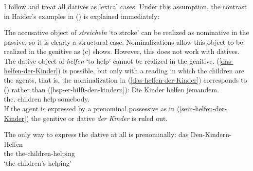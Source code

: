 I follow \citet{Haider86} and treat all datives as lexical cases. Under this assumption, the
contrast in Haider's examples \citeyearpar[]{Haider86} in () is explained immediately:
\eal
{}

\label{das-helfen-der-Kinder}
\label{sein-helfen-der-Kinder}
\zl
The accusative object of \emph{streicheln} `to stroke' can be realized as nominative in the passive,
so it is clearly a structural case. Nominalizations allow this object to be realized in the genitive
as (c) shows. However, this does not work with datives. The dative object of \emph{helfen}
`to help' cannot be realized in the genitive. (\ref{das-helfen-der-Kinder}) is possible, but only
with a reading in which the children are the agents, that is, the nominalization in
(\ref{das-helfen-der-Kinder}) corresponds to () rather than (\ref{bsp-er-hilft-den-kindern}):
\ea
\gll Die Kinder helfen jemandem.\\
     the.\NOM{} children help somebody.\DAT{}\\
\z
If the agent is expressed by a prenominal possessive as in (\ref{sein-helfen-der-Kinder}) the
genitive or dative \emph{der Kinder} is ruled out.

The only way to express the dative at all is prenominally:
\ea
\gll das Den-Kindern-Helfen\\
     the the-children-helping\\
\glt `the children's helping'
\z


